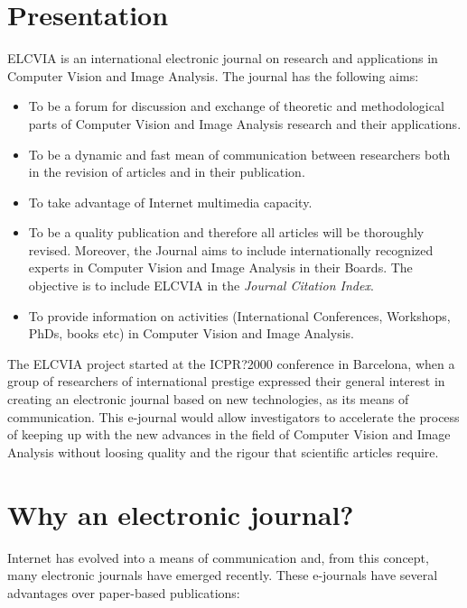 \documentclass[twoside,a4paper,11pt]{article}
\begin{document}
\section{Presentation}

ELCVIA is an international electronic journal on research and
applications in Computer  Vision and Image Analysis. The journal
has the following aims:

\begin{itemize}
\item To be a forum for discussion and exchange of theoretic
and methodological parts of Computer Vision and Image Analysis
research and their applications.

\item To be a dynamic and fast mean of communication between
researchers both in the revision of articles and in their publication.

\item To take advantage of Internet multimedia capacity.

\item To be a quality publication and therefore all articles will
be thoroughly revised. Moreover, the Journal aims to include
internationally recognized experts in
Computer Vision and Image Analysis in their Boards.
The objective is to include  ELCVIA in the {\em Journal Citation Index}.

\item To provide information on activities
(International Conferences, Workshops, PhDs, books etc) in
Computer Vision and Image Analysis.
\end{itemize}

The ELCVIA project started at the ICPR?2000 conference in Barcelona,
when a group  of researchers of international prestige expressed
their general interest in creating an electronic journal based on
new technologies, as its means of communication. This e-journal
would allow investigators to accelerate the process of keeping up
with the new advances in the field of Computer Vision and Image
Analysis without loosing quality and the rigour that scientific
articles require.

\section{Why an electronic journal?}

Internet has evolved into a means of communication and, from this
concept, many  electronic journals have emerged recently. These
e-journals have several advantages over paper-based publications:
\end{document}
